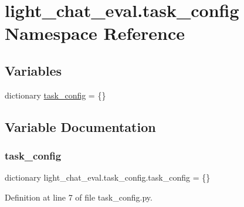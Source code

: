 \hypertarget{namespacelight__chat__eval_1_1task__config}{}\section{light\+\_\+chat\+\_\+eval.\+task\+\_\+config Namespace Reference}
\label{namespacelight__chat__eval_1_1task__config}
\subsection*{Variables}
\begin{DoxyCompactItemize}
\item 
dictionary \hyperlink{namespacelight__chat__eval_1_1task__config_acb5dd2fd8faf8631bbaf4d2f57e9a016}{task\+\_\+config} = \{\}
\end{DoxyCompactItemize}


\subsection{Variable Documentation}
\mbox{\label{namespacelight__chat__eval_1_1task__config_acb5dd2fd8faf8631bbaf4d2f57e9a016}} 
\subsubsection{\texorpdfstring{task\+\_\+config}{task\_config}}
{\footnotesize\ttfamily dictionary light\+\_\+chat\+\_\+eval.\+task\+\_\+config.\+task\+\_\+config = \{\}}



Definition at line 7 of file task\+\_\+config.\+py.


